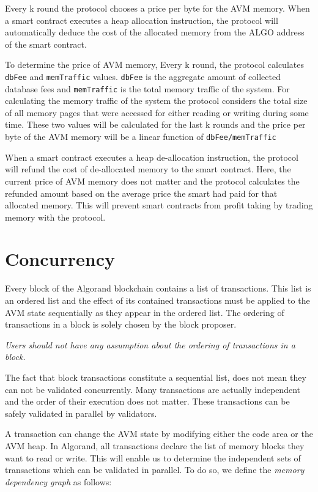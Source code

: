 \documentclass[11pt, A4]{report}
\begin{document}
    Every k round the protocol chooses a price per byte for the AVM memory. When a smart contract executes a heap
    allocation instruction, the protocol will automatically deduce the cost of the allocated memory from the ALGO
    address of the smart contract.

    To determine the price of AVM memory, Every k round, the protocol calculates \texttt{dbFee} and
    \texttt{memTraffic} values. \texttt{dbFee} is the aggregate amount of collected database fees and
    \texttt{memTraffic} is the total memory traffic of the system. For calculating the memory traffic of the system
    the protocol considers the total size of all memory pages that were accessed for either reading or writing during
    some time. These two values will be calculated for the last k rounds and the price per byte of the AVM memory
    will be a linear function of \texttt{dbFee/memTraffic}

    When a smart contract executes a heap de-allocation instruction, the protocol will refund the cost of
    de-allocated memory to the smart contract. Here, the current price of AVM memory does not matter and the protocol
    calculates the refunded amount based on the average price the smart had paid for that allocated memory. This will
    prevent smart contracts from profit taking by trading memory with the protocol.


    \section{Concurrency}\label{sec:concurrency}

    Every block of the Algorand blockchain contains a list of transactions. This list is an ordered list and the
    effect of its contained transactions must be applied to the AVM state sequentially as they appear in the ordered
    list. The ordering of transactions in a block is solely chosen by the block proposer.

    \emph{Users should not have any assumption about the ordering of transactions in a block.}

    The fact that block transactions constitute a sequential list, does not mean they can not be validated
    concurrently. Many transactions are actually independent and the order of their execution does not matter. These
    transactions can be safely validated in parallel by validators.

    A transaction can change the AVM state by modifying either the code area or the AVM heap. In Algorand, all
    transactions declare the list of memory blocks they want to read or write. This will enable us to determine the
    independent sets of transactions which can be validated in parallel. To do so, we define the \emph{memory dependency
    graph} as follows:
\end{document}
